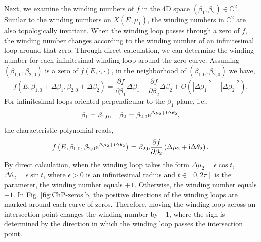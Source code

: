 Next, we examine the winding numbers of $f$ in the 4D space $(\beta_{1},\beta_{2})\in\mathbb{C}^{2}$.
Similar to the winding numbers on $X(E,\mu_{1})$, the winding numbers
in $\mathbb{C}^{2}$ are also topologically invariant. When the winding
loop passes through a zero of $f$, the winding number changes according
to the winding number of an infinitesimal loop around that zero. Through
direct calculation, we can determine the winding number for each infinitesimal
winding loop around the zero curve. Assuming $(\beta_{1,0},\beta_{2,0})$
is a zero of $f(E,\cdot,\cdot)$, in the neighborhood of $(\beta_{1,0},\beta_{2,0})$
we have, 
\begin{equation}
f\left(E,\beta_{1,0}+\Delta\beta_{1},\beta_{2,0}+\Delta\beta_{2}\right)=\frac{\partial f}{\partial\beta_{1}}\Delta\beta_{1}+\frac{\partial f}{\partial\beta_{2}}\Delta\beta_{2}+O\left(|\Delta\beta_{1}|^{2}+|\Delta\beta_{2}|^{2}\right).
\end{equation}
For infinitesimal loops oriented perpendicular to the $\beta_{1}$-plane,
i.e., 
\begin{equation}
\beta_{1}=\beta_{1,0},\quad\beta_{2}=\beta_{2,0}\mathrm{e}^{\Delta\mu_{2}+\mathrm{i}\Delta\theta_{2}},
\end{equation}
the characteristic polynomial reads, 
\begin{equation}
f\left(E,\beta_{1,0},\beta_{2,0}\mathrm{e}^{\Delta\mu_{2}+\mathrm{i}\Delta\theta_{2}}\right)=\beta_{2,0}\frac{\partial f}{\partial\beta_{2}}\left(\Delta\mu_{2}+\mathrm{i}\Delta\theta_{2}\right).
\end{equation}
By direct calculation, when the winding loop takes the form $\Delta\mu_{2}=\epsilon\cos t$,
$\Delta\theta_{2}=\epsilon\sin t$, where $\epsilon>0$ is an infinitesimal
radius and $t\in[0,2\pi]$ is the parameter, the winding number equals
$+1$. Otherwise, the winding number equals $-1$. In Fig. \ref{fig:ChP-zeros}b,
the positive directions of the winding loops are marked around each
curve of zeros. Therefore, moving the winding loop across an intersection
point changes the winding number by $\pm1$, where the sign is determined
by the direction in which the winding loop passes the intersection
point.

